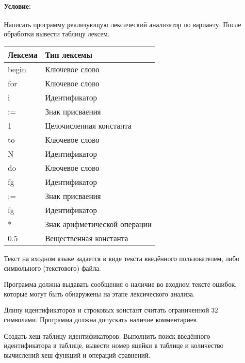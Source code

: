 \paragraph{Условие:} \hspace{0pt}

Написать программу реализующую лексический анализатор по варианту. После обработки вывести таблицу лексем.

\begin{tabular}{ | l | l | }
    \hline
    \textbf{Лексема} & \textbf{Тип лексемы}         \\ \hline
    begin            & Ключевое слово               \\ \hline
    for              & Ключевое слово               \\ \hline
    i                & Идентификатор                \\ \hline
    :=               & Знак присваения              \\ \hline
    1                & Целочисленная константа      \\ \hline
    to               & Ключевое слово               \\ \hline
    N                & Идентификатор                \\ \hline
    do               & Ключевое слово               \\ \hline
    fg               & Идентификатор                \\ \hline
    :=               & Знак присваения              \\ \hline
    fg               & Идентификатор                \\ \hline
    *                & Знак арифметической операции \\ \hline
    0.5              & Вещественная константа       \\ \hline
\end{tabular}

Текст на входном языке задается в виде текста введённого пользователем, либо символьного (текстового) файла.

Программа должна выдавать сообщения о наличие во входном тексте ошибок, которые могут быть обнаружены на этапе лексического анализа.

Длину идентификаторов и строковых констант считать ограниченной 32 символами.
Программа должна допускать наличие комментариев.

Создать хеш-таблицу идентификаторов.
Выполнить поиск введённого идентификатора в таблице, вывести номер яцейки в таблице и количество вычислений хеш-функций и операций сравнений.


